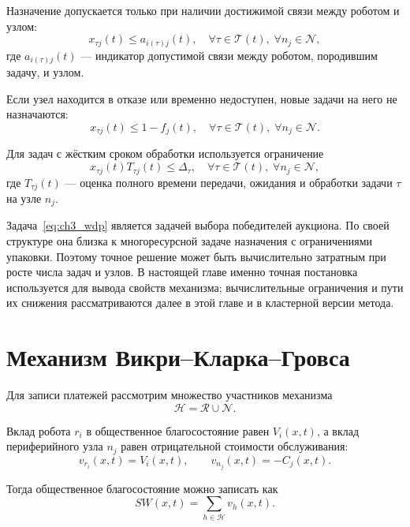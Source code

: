 Назначение допускается только при наличии достижимой связи между роботом и узлом:
\begin{equation}
x_{\tau j}(t)\leq a_{i(\tau)j}(t),\quad \forall \tau\in\mathcal{T}(t),\; \forall n_j\in\mathcal{N},
\label{eq:ch3_reachability_constraint}
\end{equation}
где $a_{i(\tau)j}(t)$ --- индикатор допустимой связи между роботом, породившим задачу, и узлом.

Если узел находится в отказе или временно недоступен, новые задачи на него не назначаются:
\begin{equation}
x_{\tau j}(t)\leq 1-f_j(t),\quad \forall \tau\in\mathcal{T}(t),\; \forall n_j\in\mathcal{N}.
\label{eq:ch3_failure_constraint}
\end{equation}

Для задач с жёстким сроком обработки используется ограничение
\begin{equation}
x_{\tau j}(t)T_{\tau j}(t)\leq \Delta_{\tau},\quad \forall \tau\in\mathcal{T}(t),\; \forall n_j\in\mathcal{N},
\label{eq:ch3_deadline_constraint}
\end{equation}
где $T_{\tau j}(t)$ --- оценка полного времени передачи, ожидания и обработки задачи $\tau$ на узле $n_j$.

Задача~\eqref{eq:ch3_wdp} является задачей выбора победителей аукциона. По своей структуре она близка к многоресурсной задаче назначения с ограничениями упаковки. Поэтому точное решение может быть вычислительно затратным при росте числа задач и узлов. В настоящей главе именно точная постановка используется для вывода свойств механизма; вычислительные ограничения и пути их снижения рассматриваются далее в этой главе и в кластерной версии метода.

\section{Механизм Викри--Кларка--Гровса}

Для записи платежей рассмотрим множество участников механизма
\[
\mathcal{H}=\mathcal{R}\cup\mathcal{N}.
\]

Вклад робота $r_i$ в общественное благосостояние равен $V_i(x,t)$, а вклад периферийного узла $n_j$ равен отрицательной стоимости обслуживания:
\begin{equation}
v_{r_i}(x,t)=V_i(x,t),\qquad v_{n_j}(x,t)=-C_j(x,t).
\label{eq:ch3_participant_values}
\end{equation}

Тогда общественное благосостояние можно записать как
\begin{equation}
SW(x,t)=\sum_{h\in\mathcal{H}}v_h(x,t).
\label{eq:ch3_sw_by_agents}
\end{equation}

